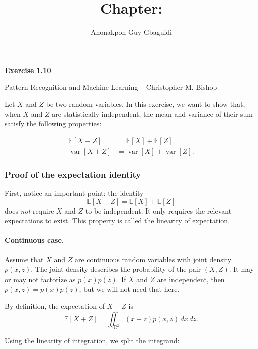 \documentclass{article}
\title{Chapter: \ChapterName}
\author{Ahonakpon Guy Gbaguidi}
\date{}
\newcommand{\BookName}{Pattern Recognition and Machine Learning}
\newcommand{\BookAuthor}{Christopher M. Bishop}
\newcommand{\ExerciseID}{1.10}
\begin{document}
\maketitle

\begin{center}
  \large\textbf{Exercise \ExerciseID}

  \vspace{0.5em}

  \normalsize\BookName\ - \BookAuthor
\end{center}

\begin{tcolorbox}[breakable,colback=gray!5,colframe=gray!60,title=Solution]
Let \(X\) and \(Z\) be two random variables. In this exercise, we want to show that, when
\(X\) and \(Z\) are statistically independent, the mean and variance of their sum satisfy
the following properties:

\begin{align*}
  \mathbb{E}[X+Z] &= \mathbb{E}[X] + \mathbb{E}[Z] \tag{1.128} \\
  \operatorname{var}[X+Z] &= \operatorname{var}[X] + \operatorname{var}[Z]. \tag{1.129}
\end{align*}

\subsubsection*{Proof of the expectation identity}

First, notice an important point: the identity
\[
  \mathbb{E}[X+Z] = \mathbb{E}[X] + \mathbb{E}[Z]
\]
does \emph{not} require \(X\) and \(Z\) to be independent. It only requires the relevant
expectations to exist. This property is called the linearity of expectation.

\paragraph{Continuous case.}
Assume that \(X\) and \(Z\) are continuous random variables with joint density
\(p(x,z)\). The joint density describes the probability of the pair \((X,Z)\). It may or
may not factorize as \(p(x)p(z)\). If \(X\) and \(Z\) are independent, then
\(p(x,z)=p(x)p(z)\), but we will not need that here.

By definition, the expectation of \(X+Z\) is
\[
  \mathbb{E}[X+Z]
  =
  \iint_{\mathbb{R}^2}
  (x+z)p(x,z)\,dx\,dz.
\]

Using the linearity of integration, we split the integrand:


\end{tcolorbox}
\end{document}
